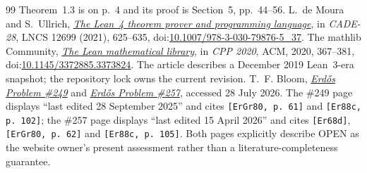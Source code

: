 \documentclass[11pt]{article}
\theoremstyle{definition}
\theoremstyle{remark}
\begin{document}
\begin{thebibliography}{99}
  Theorem~1.3 is on p.~4 and its proof is Section~5, pp.~44--56.
 L.~de Moura and S.~Ullrich,
  \href{https://doi.org/10.1007/978-3-030-79876-5_37}
  {\emph{The Lean~4 theorem prover and programming language}},
  in \emph{CADE-28}, LNCS 12699 (2021), 625--635,
  doi:\href{https://doi.org/10.1007/978-3-030-79876-5_37}
  {10.1007/978-3-030-79876-5\_37}.
 The mathlib Community,
  \href{https://doi.org/10.1145/3372885.3373824}
  {\emph{The Lean mathematical library}},
  in \emph{CPP 2020}, ACM, 2020, 367--381,
  doi:\href{https://doi.org/10.1145/3372885.3373824}
  {10.1145/3372885.3373824}.  The article describes a December 2019
  Lean~3-era snapshot; the repository lock owns the current revision.
 T.~F. Bloom,
  \href{https://www.erdosproblems.com/249}{\emph{Erd\H{o}s Problem \#249}} and
  \href{https://www.erdosproblems.com/257}{\emph{Erd\H{o}s Problem \#257}}\unskip,
  accessed 28 July 2026.  The \#249 page displays ``last edited 28 September
  2025'' and cites \texttt{[ErGr80, p.~61]} and
  \texttt{[Er88c, p.~102]}; the \#257 page displays ``last edited 15 April
  2026'' and cites \texttt{[Er68d]}, \texttt{[ErGr80, p.~62]} and
  \texttt{[Er88c, p.~105]}.  Both pages explicitly describe OPEN as the
  website owner's present assessment rather than a literature-completeness
  guarantee.

\end{thebibliography}
\end{document}
